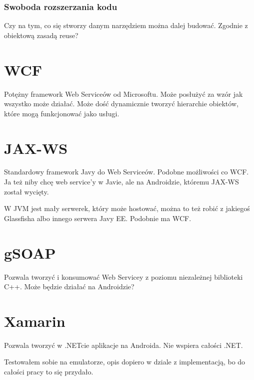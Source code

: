 \subsubsection{Swoboda rozszerzania kodu}
Czy na tym, co się stworzy danym narzędziem można dalej budować. Zgodnie z obiektową zasadą reuse?

\section{WCF}
Potężny framework Web Serviceów od Microsoftu. Może posłużyć za wzór jak wszystko może działać. Może dość dynamicznie tworzyć hierarchie obiektów, które mogą funkcjonować jako usługi.


\section{JAX-WS}
Standardowy framework Javy do Web Serviceów. Podobne możliwości co WCF. Ja też niby chcę web service'y w Javie, ale na Androidzie, któremu JAX-WS został wycięty.

W JVM jest mały serwerek, który może hostować, można to też robić z jakiegoś Glassfisha albo innego serwera Javy EE. Podobnie ma WCF.

\section{gSOAP}
Pozwala tworzyć i konsumować Web Servicey z poziomu niezależnej biblioteki C++. Może będzie działać na Androidzie?

\section{Xamarin}
Pozwala tworzyć w .NETcie aplikacje na Androida. Nie wspiera całości .NET.

Testowałem sobie na emulatorze, opis dopiero w dziale z implementacją, bo do całości pracy to się przydało.


